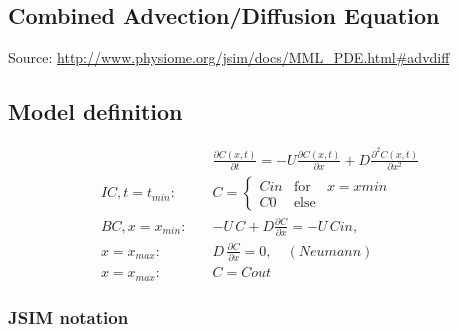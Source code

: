 \bigskip
\subsection{Combined Advection/Diffusion Equation}
\label{sec:diffAdvectionEq}

Source: \url{http://www.physiome.org/jsim/docs/MML_PDE.html#advdiff}

\subsection*{Model definition}

\begin{align}
& \frac{\partial C(x,t)}{\partial t}  = - U \frac{\partial C(x,t)}{\partial x} + D \frac{\partial^2 C(x,t)}{\partial x^2} \nonumber \\
IC, t=t_{min}: \quad & C =  \left\{ \begin{array}{rcl}  	Cin & \mbox{for} & x = xmin \\ 
										C0 & \mbox{else} \end{array}\right. \nonumber \\
BC, x=x_{min}: \quad & -U \,C + D \frac{\partial C}{\partial x}= -U \,Cin,  \nonumber \\
	x=x_{max}: \quad & D \,\frac{\partial C}{\partial x} = 0 , \quad (Neumann) \nonumber \\
	x=x_{max}: \quad & C = Cout \nonumber 
\end{align}


%

\subsubsection*{JSIM notation}

